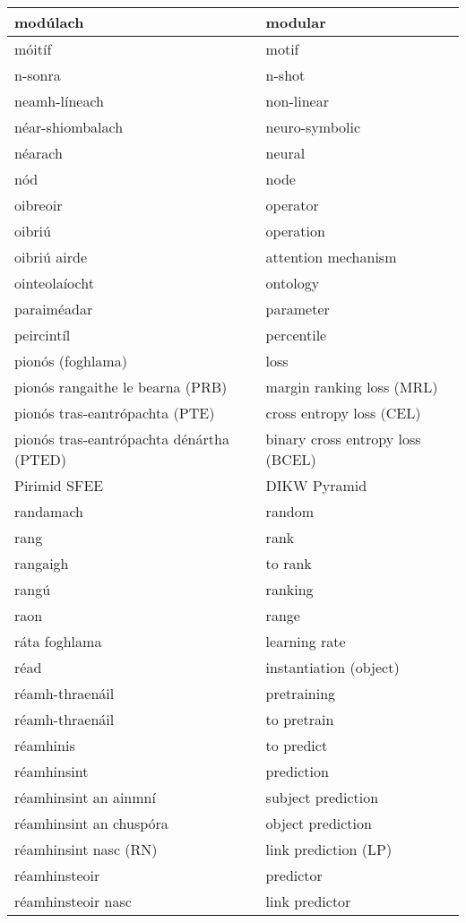 \begin{longtable}{|l|l|}
		modúlach&modular\\ \hline 
		móitíf&motif\\ \hline 
		n-sonra&n-shot\\ \hline 
		neamh-líneach&non-linear\\ \hline 
		néar-shiombalach&neuro-symbolic\\ \hline 
		néarach&neural\\ \hline 
		nód&node\\ \hline 
		oibreoir&operator\\ \hline 
		oibriú&operation\\ \hline 
		oibriú airde&attention mechanism\\ \hline 
		ointeolaíocht&ontology\\ \hline 
		paraiméadar&parameter\\ \hline 
		peircintíl&percentile\\ \hline 
		pionós (foghlama)&loss\\ \hline 
		pionós rangaithe le bearna (PRB)&margin ranking loss (MRL)\\ \hline 
		pionós tras-eantrópachta (PTE)&cross entropy loss (CEL)\\ \hline 
		pionós tras-eantrópachta dénártha (PTED)&binary cross entropy loss (BCEL)\\ \hline 
		Pirimid SFEE&DIKW Pyramid\\ \hline 
		randamach&random\\ \hline 
		rang&rank\\ \hline 
		rangaigh&to rank\\ \hline 
		rangú&ranking\\ \hline 
		raon&range\\ \hline 
		ráta foghlama&learning rate\\ \hline 
		réad&instantiation (object)\\ \hline 
		réamh-thraenáil&pretraining\\ \hline 
		réamh-thraenáil&to pretrain\\ \hline 
		réamhinis&to predict\\ \hline 
		réamhinsint&prediction\\ \hline 
		réamhinsint an ainmní&subject prediction\\ \hline 
		réamhinsint an chuspóra&object prediction\\ \hline 
		réamhinsint nasc (RN)&link prediction (LP)\\ \hline 
		réamhinsteoir&predictor\\ \hline 
		réamhinsteoir nasc&link predictor\\ \hline 

\end{longtable}
